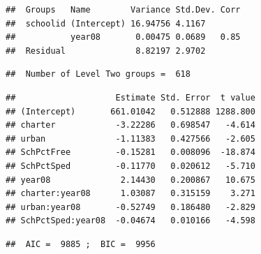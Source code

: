 \documentclass[
]{krantz}
\begin{document}
\begin{verbatim}
##  Groups   Name        Variance Std.Dev. Corr
##  schoolid (Intercept) 16.94756 4.1167       
##           year08       0.00475 0.0689   0.85
##  Residual              8.82197 2.9702
\end{verbatim}

\begin{verbatim}
##  Number of Level Two groups =  618
\end{verbatim}

\begin{verbatim}
##                    Estimate Std. Error  t value
## (Intercept)       661.01042   0.512888 1288.800
## charter            -3.22286   0.698547   -4.614
## urban              -1.11383   0.427566   -2.605
## SchPctFree         -0.15281   0.008096  -18.874
## SchPctSped         -0.11770   0.020612   -5.710
## year08              2.14430   0.200867   10.675
## charter:year08      1.03087   0.315159    3.271
## urban:year08       -0.52749   0.186480   -2.829
## SchPctSped:year08  -0.04674   0.010166   -4.598
\end{verbatim}

\begin{verbatim}
##  AIC =  9885 ;  BIC =  9956
\end{verbatim}
\end{document}
